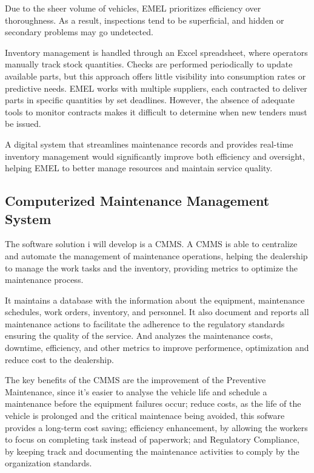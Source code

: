 Due to the sheer volume of vehicles, EMEL prioritizes efficiency over thoroughness. As a result, inspections tend to be superficial, and hidden or secondary problems may go undetected.

Inventory management is handled through an Excel spreadsheet, where operators manually track stock quantities. Checks are performed periodically to update available parts, but this approach offers little visibility into consumption rates or predictive needs. EMEL works with multiple suppliers, each contracted to deliver parts in specific quantities by set deadlines. However, the absence of adequate tools to monitor contracts makes it difficult to determine when new tenders must be issued.

A digital system that streamlines maintenance records and provides real-time inventory management would significantly improve both efficiency and oversight, helping EMEL to better manage resources and maintain service quality.


\subsection{Computerized Maintenance Management System}

The software solution i will develop is a \ac{CMMS}.
A \ac{CMMS} is able to centralize and automate the management of maintenance operations, helping the dealership to manage the work tasks and the inventory, providing metrics to optimize the maintenance process.

It maintains a database with the information about the equipment, maintenance schedules, work orders, inventory, and personnel. 
It also document and reports all maintenance actions to facilitate the adherence to the regulatory standards ensuring the quality of the service. 
And analyzes the maintenance costs, downtime, efficiency, and other metrics to improve performence, optimization and reduce cost to the dealership.

The key benefits of the \ac{CMMS} are the improvement of the Preventive Maintenance, since it's easier to analyse the vehicle life and schedule a maintenance before the equipment failures occur; reduce costs, as the life of the vehicle is prolonged and the critical maintenace being avoided, this sofware provides a long-term cost saving; efficiency enhancement, by allowing the workers to focus on completing task instead of paperwork; and Regulatory Compliance, by keeping track and documenting the maintenance activities to comply by the organization standards. 

